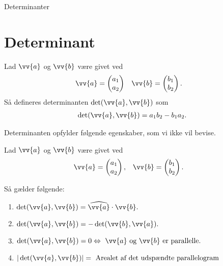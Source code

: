 \begin{center}
\Huge
Determinanter
\end{center}

\section*{Determinant}

\begin{defn}[Determinant]
	Lad $\vv{a}$ og $\vv{b}$ være givet ved
	\begin{align*}
		&\vv{a} =
		\begin{pmatrix}
			a_1 \\ a_2	
		\end{pmatrix}
		&& \vv{b} = 
		\begin{pmatrix}
			b_1 \\ b_2
		\end{pmatrix}.		 		 
	\end{align*}
	Så defineres determinanten $\det(\vv{a},\vv{b})$ som
	\begin{align*}
		\det(\vv{a},\vv{b}) = a_1b_2 - b_1a_2.
	\end{align*}
\end{defn}

Determinanten opfylder følgende egenskaber, som vi ikke vil bevise.
\begin{setn}
Lad $\vv{a}$ og $\vv{b}$ være givet ved
\begin{align*}
	&\vv{a} = 
	\begin{pmatrix}
		a_1 \\ a_2
	\end{pmatrix},
	&& \vv{b} = 
	\begin{pmatrix}
		b_1 \\ b_2
	\end{pmatrix}.
\end{align*}

Så gælder følgende:
	 \begin{enumerate}[label=\roman*)]
	 	\item $\det(\vv{a},\vv{b}) = \widehat{\vv{a}}\cdot \vv{b}.$
	 	\item $\det(\vv{a},\vv{b}) = -\det(\vv{b},\vv{a}).$
	 	\item $\det(\vv{a},\vv{b})=0 \Leftrightarrow \ \vv{a}\textnormal{ og }\vv{b}
	 	\textnormal{ er parallelle.}$
	 	\item $|\det(\vv{a},\vv{b})| = \textnormal{ Arealet af det udspændte parallelogram}$
	 \end{enumerate}
\end{setn}

